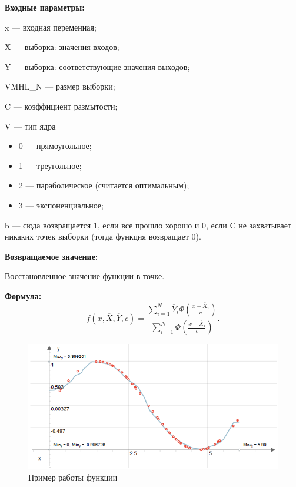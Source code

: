 \textbf{Входные параметры:} 
 
x --- входная переменная;
 
X --- выборка: значения входов;
 
Y --- выборка: соответствующие значения выходов;
 
VMHL\_N --- размер выборки;
 
C --- коэффициент размытости;
 
V --- тип ядра
 
 \begin{itemize}
 \item  0 --- прямоугольное;
 \item  1 --- треугольное;
 \item  2 --- параболическое (считается оптимальным);
 \item   3 --- экспоненциальное;
 \end{itemize}
 
b --- сюда возвращается 1, если все прошло хорошо и 0, если C не захватывает никаких точек выборки (тогда функция возвращает 0).

\textbf{Возвращаемое значение:}
 
Восстановленное значение функции в точке.

\textbf{Формула:}
\begin{equation*}
f\left( x, \overline{X},\overline{Y}, c\right) =\dfrac{\sum_{i=1}^{N}\overline{Y}_i\Phi\left( \frac{x-\overline{X}_i}{c}\right) }{\sum_{i=1}^{N}\Phi\left( \frac{x-\overline{X}_i}{c}\right) }.
\end{equation*}

 \begin{figure} [h] 
   \center
   \includegraphics {MHL_NonparametricEstimatorOfRegression.png}
   \caption{Пример работы функции} 
   \label{img:MHL_NonparametricEstimatorOfRegression}  
 \end{figure}